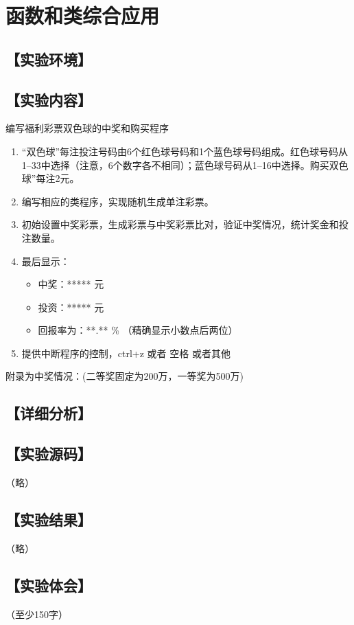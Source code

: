 \section{函数和类综合应用}
\hfill{}
\subsection*{【实验环境】}
\MyEnvironment
\subsection*{【实验内容】}
编写福利彩票双色球的中奖和购买程序

\begin{enumerate}
\item  “双色球”每注投注号码由6个红色球号码和1个蓝色球号码组成。红色球号码从1--33中选择（注意，6个数字各不相同）；蓝色球号码从1--16中选择。购买双色球”每注2元。
\item 编写相应的类程序，实现随机生成单注彩票。
\item 初始设置中奖彩票，生成彩票与中奖彩票比对，验证中奖情况，统计奖金和投注数量。
\item 最后显示：
\begin{itemize}[label={}]
\item 中奖：***** 元
\item 投资：***** 元
\item 回报率为：**.** \% （精确显示小数点后两位）
\end{itemize}
\item 提供中断程序的控制，ctrl+z 或者 空格 或者其他
\end{enumerate}

附录为中奖情况：(二等奖固定为200万，一等奖为500万)

\subsection*{【详细分析】}

\subsection*{【实验源码】}
（略）
\subsection*{【实验结果】}
（略）
\subsection*{【实验体会】}
（至少150字）
